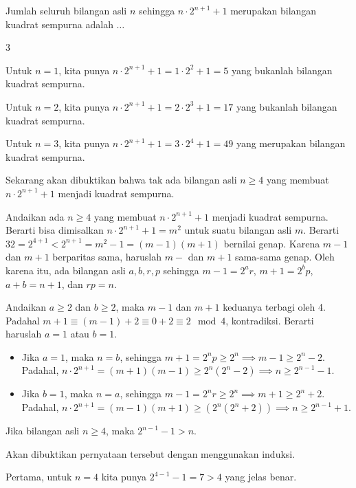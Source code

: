 \documentclass[12pt]{scrartcl}
\begin{document}
	\begin{soalbaru}
		Jumlah seluruh bilangan asli $n$ sehingga $n\cdot 2^{n+1}+1$ merupakan bilangan kuadrat sempurna adalah $\dots$
		
		\begin{jawaban}
		3
		\end{jawaban}
		\begin{solusi}
			Untuk $n=1$, kita punya $n\cdot2^{n+1}+1=1\cdot2^2+1=5$ yang bukanlah bilangan kuadrat sempurna.
			
			Untuk $n=2$, kita punya $n\cdot2^{n+1}+1=2\cdot2^3+1=17$ yang bukanlah bilangan kuadrat sempurna. 
			
			Untuk $n=3$, kita punya $n\cdot2^{n+1}+1=3\cdot2^4+1=49$ yang merupakan bilangan kuadrat sempurna.
			
			Sekarang akan dibuktikan bahwa tak ada bilangan asli $n \ge 4$ yang membuat $n\cdot2^{n+1}+1$ menjadi kuadrat sempurna.
			
			Andaikan ada $n \ge 4$ yang membuat $n\cdot2^{n+1}+1$ menjadi kuadrat sempurna. Berarti bisa dimisalkan $n\cdot2^{n+1}+1=m^2$ untuk suatu bilangan asli $m$. Berarti $32=2^{4+1}<2^{n+1} = m^2-1=(m-1)(m+1)$ bernilai genap. Karena $m-1$ dan $m+1$ berparitas sama, haruslah $m-$ dan $m+1$ sama-sama genap. Oleh karena itu, ada bilangan asli $a,b,r,p$ sehingga $m-1 = 2^a r$, $m+1=2^b p$, $a+b=n+1$, dan $rp=n$.
			
			Andaikan $a \ge 2$ dan $b \ge 2$, maka $m-1$ dan $m+1$ keduanya terbagi oleh 4. Padahal $m+1 \equiv (m-1)+2 \equiv 0 + 2 \equiv 2 \mod 4$, kontradiksi. Berarti haruslah $a = 1$ atau $b=1$.
			
			\begin{itemize}
			\item Jika $a=1$, maka $n=b$, sehingga $m+1=2^np \ge 2^n \implies m-1 \ge 2^n-2$. Padahal, $n\cdot 2^{n+1} = (m+1)(m-1) \ge 2^n(2^n-2)  \implies n \ge 2^{n-1}-1.$
			
			\item Jika $b=1$, maka $n=a$, sehingga $m-1=2^nr \ge 2^n \implies m+1 \ge 2^n+2$. Padahal, $n\cdot 2^{n+1} = (m-1)(m+1) \ge (2^n(2^n+2))  \implies n \ge 2^{n-1}+1.$
			\end{itemize}
			
			\begin{lemmarev}
			Jika bilangan asli $n \ge 4$, maka $2^{n-1}-1 > n$.
			\begin{buktilemma}
			Akan dibuktikan pernyataan tersebut dengan menggunakan induksi.
			
			Pertama, untuk $n=4$ kita punya $2^{4-1}-1=7 > 4$ yang jelas benar.
			

\end{buktilemma}
\end{lemmarev}
\end{solusi}
\end{soalbaru}
\end{document}
